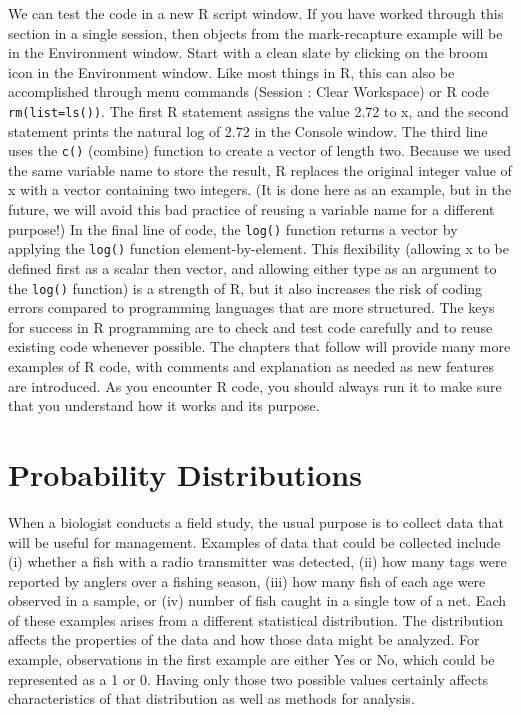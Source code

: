 \documentclass[
]{krantz}
\begin{document}
We can test the code in a new R script window. If you have worked through this section in a single session, then objects from the mark-recapture example will be in the Environment window. Start with a clean slate by clicking on the broom icon in the Environment window. Like most things in R, this can also be accomplished through menu commands (Session : Clear Workspace) or R code \texttt{rm(list=ls())}. The first R statement assigns the value 2.72 to x, and the second statement prints the natural log of 2.72 in the Console window. The third line uses the \texttt{c()} (combine) function to create a vector of length two. Because we used the same variable name to store the result, R replaces the original integer value of x with a vector containing two integers. (It is done here as an example, but in the future, we will avoid this bad practice of reusing a variable name for a different purpose!) In the final line of code, the \texttt{log()} function returns a vector by applying the \texttt{log()} function element-by-element. This flexibility (allowing x to be defined first as a scalar then vector, and allowing either type as an argument to the \texttt{log()} function) is a strength of R, but it also increases the risk of coding errors compared to programming languages that are more structured. The keys for success in R programming are to check and test code carefully and to reuse existing code whenever possible. The chapters that follow will provide many more examples of R code, with comments and explanation as needed as new features are introduced. As you encounter R code, you should always run it to make sure that you understand how it works and its purpose.

\hypertarget{Distributions}{%
\chapter{Probability Distributions}\label{Distributions}}

When a biologist conducts a field study, the usual purpose is to collect data that will be useful for management. Examples of data that could be collected include (i) whether a fish with a radio transmitter was detected, (ii) how many tags were reported by anglers over a fishing season, (iii) how many fish of each age were observed in a sample, or (iv) number of fish caught in a single tow of a net. Each of these examples arises from a different statistical distribution. The distribution affects the properties of the data and how those data might be analyzed. For example, observations in the first example are either Yes or No, which could be represented as a 1 or 0. Having only those two possible values certainly affects characteristics of that distribution as well as methods for analysis.
\end{document}
